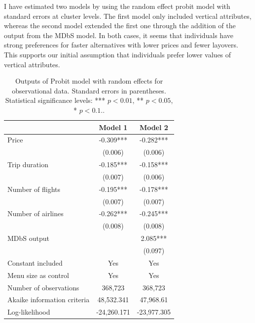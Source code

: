 \documentclass[a4paper,12pt]{article}
\begin{document}
I have estimated two models by using the random effect probit model with standard errors at cluster levels. The first model only included vertical attributes, whereas the second model extended the first one through the addition of the output from the MDbS model. In both cases, it seems that individuals have strong preferences for faster alternatives with lower prices and fewer layovers. This supports our initial assumption that individuals prefer lower values of vertical attributes. 

\begin{table}
    \centering

    \begin{tabular}{lcc}
    \hline
     & Model 1 & Model 2 \\
    \hline
    Price & -0.309*** & -0.282*** \\
     & (0.006) & (0.006) \\[1ex]
    Trip duration & -0.185*** & -0.158*** \\
     & (0.007) & (0.006) \\[1ex]
    Number of flights & -0.195*** & -0.178*** \\
     & (0.007) & (0.007) \\[1ex]
    Number of airlines & -0.262*** & -0.245*** \\
     & (0.008) & (0.008) \\[1ex]
    MDbS output & & 2.085*** \\
     & & (0.097) \\[1ex]
    Constant included & Yes & Yes \\[1ex]
    Menu size as control & Yes & Yes \\[1ex]
    Number of observations & 368,723 & 368,723 \\[1ex]
    Akaike information criteria & 48,532.341 & 47,968.61 \\[1ex]
    Log-likelihood & -24,260.171 & -23,977.305 \\[1ex]
    \hline
    \end{tabular}
    \caption[Outputs of Probit model for observational data]{Outputs of Probit model with random effects for observational data. Standard errors in parentheses. Statistical significance levels: *** $p<0.01$, ** $p<0.05$, * $p<0.1.$.}
    \label{tab:amadeusProbitResults}
\end{table}
\end{document}
